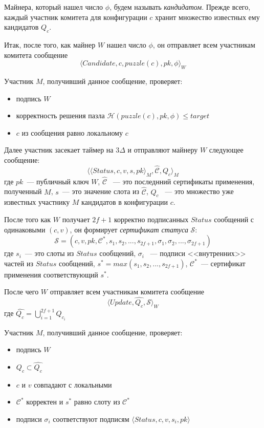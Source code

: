 Майнера, который нашел число $\phi$, будем называть \textit{кандидатом}.
Прежде всего, каждый участник комитета для конфигурации $c$ хранит множество известных ему кандидатов $Q_c$.
\vspace{10pt}

Итак, после того, как майнер $W$ нашел число $\phi$, он отправляет всем участникам комитета сообщение
 \[ \langle Candidate, c, puzzle(c), pk, \phi \rangle_W \]
 
Участник $M$, получивший данное сообщение, проверяет:
\begin{itemize}
\item подпись $W$ 
\item корректность решения пазла $\mathcal{H}(puzzle(c), pk, \phi) \le target$
\item $c$ из сообщения равно локальному $c$ 
\end{itemize}
Далее участник засекает таймер на $3\Delta$ и отправляют майнеру $W$ следующее сообщение:
 \[ \langle \langle Status, c, v, s, pk \rangle_M , \hat{\mathcal{C}}, Q_c \rangle_M \]
где $pk$~--- публичный ключ $W$, $\hat{\mathcal{C}}$ ~--- это последнний сертификаты применения, полученный $M$, $s$~--- это значение слота из $\hat{\mathcal{C}}$,
$Q_c$ ~--- это множество уже известных участнику $M$ кандидатов в конфигурации $c$.
\vspace{10pt}

После того как $W$ получает $2f+1$ корректно подписанных $Status$ сообщений с одинаковыми $(c, v)$, он формирует \textit{сертификат статуса} $\mathcal{S}$:
$$\mathcal{S}=(c, v, pk, \mathcal{C}^{*}, s_1, s_2,..., s_{2f+1}, \sigma_1, \sigma_2,..., \sigma_{2f+1})$$
где $s_i$~--- это слоты из $Status$ сообщений, 
$\sigma_i$ ~--- подписи <<внутренних>> частей из $Status$ сообщений, $s^{*}=max(s_1, s_2,..., s_{2f+1})$,
$\mathcal{C}^{*}$~--- сертификат применения соответствующий $s^{*}$.

После чего $W$ отправляет всем участникам комитета сообщение
 \[ \langle Update, \hat{Q_c}, \mathcal{S} \rangle_W \]
где $\hat{Q_c}=\bigcup\limits_{i=1}^{2f+1} Q_{c_i}$

Участник $M$, получивший данное сообщение, проверяет:
\begin{itemize}
\item подпись $W$
\item $Q_c \subset \hat{Q_c}$
\item $c$ и $v$ совпадают с локальными
\item $\mathcal{C}^{*}$ корректен и $s^{*}$ равно слоту из $\mathcal{C}^{*}$
\item подписи $\sigma_i$ соответствуют подписям $\langle Status, c, v, s_i, pk \rangle$
\end{itemize}

